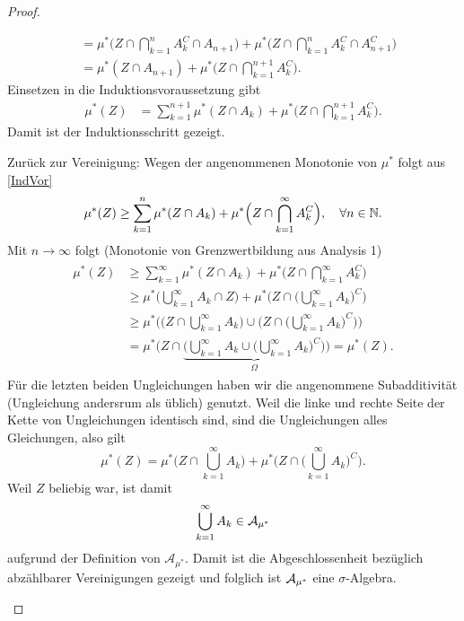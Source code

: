\begin{proof}
\begin{enumerate}[label=(\roman*)]
\begin{itemize}
\begin{align*}
			&= \mu^{*}\Big(Z \cap \bigcap\limits_{k=1}^{n} A_k^C \cap A_{n+1} \Big) + \mu^{*}\Big(Z \cap \bigcap\limits_{k=1}^{n} A_k^C \cap A_{n+1}^C \Big)\\
			 &= \mu^{*}(Z \cap A_{n+1})+ \mu^{*}\Big(Z \cap \bigcap\limits_{k=1}^{n + 1} A_k^C \Big).
		\end{align*}
		Einsetzen in die Induktionsvoraussetzung gibt
		\begin{align*}
			\mu^{*}(Z) & = \sum\limits_{k = 1}^{n + 1} \mu^{*}(Z \cap A_k) + \mu^{*}\Big(Z \cap \bigcap\limits_{k=1}^{n + 1} A_k^C \Big).
		\end{align*}
		Damit ist der Induktionsschritt gezeigt.
	\end{itemize}
	Zur\"uck zur Vereinigung: Wegen der angenommenen Monotonie von $\mu^*$ folgt aus \eqref{IndVor}  \[ \mu^{*}(Z) \geq \sum\limits_{k=1}^{n} \mu^{*}(Z \cap A_k) + \mu^{*}\Big(Z \cap \bigcap\limits_{k = 1}^{\infty} A_k^C\Big), \quad \forall n \in \mathbb{N}. \]
		Mit $n \to \infty$ folgt (Monotonie von Grenzwertbildung aus Analysis 1)
		\begin{align}\label{ab}
		\begin{split}
			\mu^{*}(Z) &\geq \sum\limits_{k=1}^{\infty} \mu^{*}(Z \cap A_k) + \mu^{*}\Big(Z \cap \bigcap\limits_{k = 1}^{\infty} A_k^C\Big)\\ 
			&\geq \mu^{*} \Big(\bigcup\limits_{k = 1}^{\infty} A_k \cap Z \Big) + \mu^{*}\Big(Z \cap \Big(\bigcup\limits_{k = 1}^{\infty} A_k\Big)^C\Big)\\
			&\geq  \mu^{*}\Big(\Big(Z \cap \bigcup\limits_{k = 1}^{\infty} A_k\Big) \cup \Big(Z\cap \Big(\bigcup\limits_{k = 1}^{\infty} A_k\Big)^C\Big)\Big)\\
			& = \mu^{*}\Big(Z \cap \underbrace{\Big(\bigcup\limits_{k= 1}^{\infty} A_k\cup \Big(\bigcup\limits_{k= 1}^{\infty} A_k\Big)^C\Big)}_{\Omega}\Big) = \mu^{*}(Z).
		\end{split}
		\end{align}
		F\"ur die letzten beiden Ungleichungen haben wir die angenommene Subadditivit\"at (Ungleichung andersrum als \"ublich) genutzt. 
	Weil die linke und rechte Seite der Kette von Ungleichungen identisch sind, sind die Ungleichungen alles Gleichungen, also gilt \[ \mu^{*}(Z) = \mu^{*}\Big(Z \cap \bigcup\limits_{k=1}^{\infty} A_k\Big) + \mu^{*}\Big(Z \cap \Big(\bigcup\limits_{k=1}^{\infty} A_k\Big)^C\Big).  \] Weil $Z$ beliebig war, ist damit \[ \bigcup\limits_{k=1}^{\infty} A_k \in \mathcal{A}_{\mu^{*}} \] aufgrund der Definition von $\mathcal A_{\mu^*}$.	Damit ist die Abgeschlossenheit bez\"uglich abz\"ahlbarer Vereinigungen gezeigt und folglich ist $\mathcal{A}_{\mu^{*}}$ eine $\sigma$-Algebra. 
		\end{enumerate}


\end{proof}
